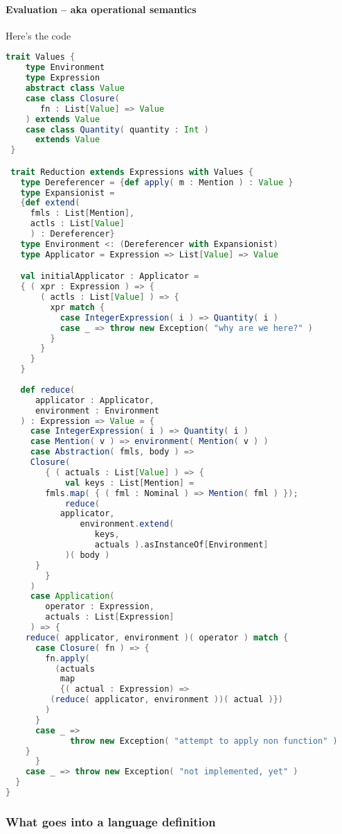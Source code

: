 \paragraph{Evaluation -- aka operational semantics}

Here's the code

\begin{lstlisting}[language=Scala]
  trait Values {
    type Environment
    type Expression
    abstract class Value
    case class Closure(
       fn : List[Value] => Value
    ) extends Value
    case class Quantity( quantity : Int )
      extends Value
 }

 trait Reduction extends Expressions with Values {
   type Dereferencer = {def apply( m : Mention ) : Value }
   type Expansionist =
   {def extend(
     fmls : List[Mention],
     actls : List[Value]
     ) : Dereferencer}
   type Environment <: (Dereferencer with Expansionist)
   type Applicator = Expression => List[Value] => Value

   val initialApplicator : Applicator =
   { ( xpr : Expression ) => {
       ( actls : List[Value] ) => {
         xpr match {
           case IntegerExpression( i ) => Quantity( i )
           case _ => throw new Exception( "why are we here?" )
         }
       }
     }
   }
   
   def reduce(
      applicator : Applicator,
      environment : Environment
   ) : Expression => Value = { 
     case IntegerExpression( i ) => Quantity( i )
     case Mention( v ) => environment( Mention( v ) )
     case Abstraction( fmls, body ) =>
     Closure(
        { ( actuals : List[Value] ) => {
            val keys : List[Mention] =
 	    fmls.map( { ( fml : Nominal ) => Mention( fml ) });
            reduce(
	       applicator,
               environment.extend(
                  keys,
                  actuals ).asInstanceOf[Environment]
            )( body )
	  }
        }
     )
     case Application(
        operator : Expression,
        actuals : List[Expression]
     ) => {
	reduce( applicator, environment )( operator ) match {
	  case Closure( fn ) => {
	    fn.apply(
	      (actuals
	       map
	       {( actual : Expression) =>
		 (reduce( applicator, environment ))( actual )})
	    )
	  }
	  case _ =>
             throw new Exception( "attempt to apply non function" )
	}
      }
    case _ => throw new Exception( "not implemented, yet" )
  }
}
\end{lstlisting}

\subsubsection{What goes into a language definition}

